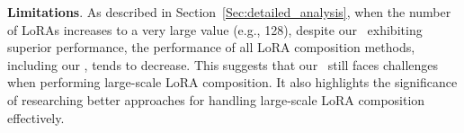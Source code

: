 \noindent\textbf{Limitations}. As described in Section~\ref{Sec:detailed_analysis}, when the number of LoRAs increases to a very large value (e.g., 128), despite our \our~exhibiting superior performance, the performance of all LoRA composition methods, including our \our, tends to decrease. This suggests that our \our~still faces challenges when performing large-scale LoRA composition. It also highlights the significance of researching better approaches for handling large-scale LoRA composition effectively.

\clearpage

